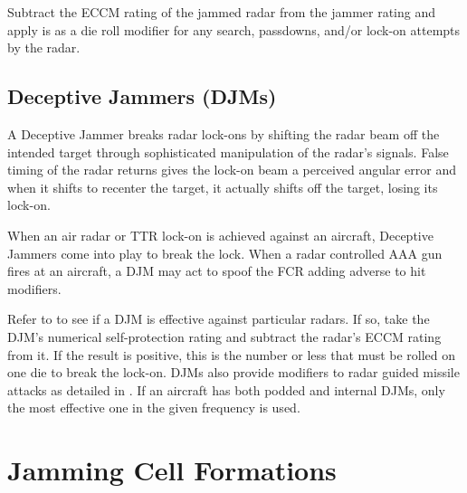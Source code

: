 \begin{advancedrules}
    Subtract the ECCM rating of the jammed radar from the  jammer rating and apply is as a die roll modifier for any search, passdowns, and/or lock-on attempts by the radar.


    \subsection{Deceptive Jammers (DJMs)}
    \label{rule:deceptive-jammers}

    A Deceptive Jammer breaks radar lock-ons by shifting the radar beam off the intended target through sophisticated manipulation of the radar's signals. False timing of the radar returns gives the lock-on beam a perceived angular error and when it shifts to recenter the target, it actually shifts off the target, losing its lock-on.

    When an air radar or TTR lock-on is achieved against an aircraft, Deceptive Jammers come into play to break the lock. When a radar controlled AAA gun fires at an aircraft, a DJM may act to spoof the FCR adding adverse to hit modifiers.

    Refer to  to see if a DJM is effective against particular radars. If so, take the DJM's numerical self-protection rating and subtract the radar's ECCM rating from it.  If the result is positive, this is the number or less that must be rolled on one die to break the lock-on. DJMs also provide modifiers to radar guided missile attacks as detailed in . If an aircraft has both podded and internal DJMs, only the most effective one in the given frequency is used.


    \section{Jamming Cell Formations}


\end{advancedrules}
